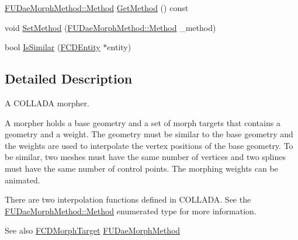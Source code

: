 \begin{DoxyCompactItemize}
\item 
\hyperlink{namespaceFUDaeMorphMethod_a097fa073638c4df9edf9479f8561329e}{FUDaeMorphMethod::Method} \hyperlink{classFCDMorphController_a71ff7b5ac5470f189b0f04f8674d2c3c}{GetMethod} () const 
\item 
void \hyperlink{classFCDMorphController_af7519da3b3d47febca0b7a36f34aa3ec}{SetMethod} (\hyperlink{namespaceFUDaeMorphMethod_a097fa073638c4df9edf9479f8561329e}{FUDaeMorphMethod::Method} \_\-method)
\item 
bool \hyperlink{classFCDMorphController_a43685ec9f55c43b66e75f62c8b820980}{IsSimilar} (\hyperlink{classFCDEntity}{FCDEntity} $\ast$entity)
\end{DoxyCompactItemize}


\subsection{Detailed Description}
A COLLADA morpher.

A morpher holds a base geometry and a set of morph targets that contains a geometry and a weight. The geometry must be similar to the base geometry and the weights are used to interpolate the vertex positions of the base geometry. To be similar, two meshes must have the same number of vertices and two splines must have the same number of control points. The morphing weights can be animated.

There are two interpolation functions defined in COLLADA. See the \hyperlink{namespaceFUDaeMorphMethod_a097fa073638c4df9edf9479f8561329e}{FUDaeMorphMethod::Method} enumerated type for more information.

\begin{DoxySeeAlso}{See also}
\hyperlink{classFCDMorphTarget}{FCDMorphTarget} \hyperlink{namespaceFUDaeMorphMethod}{FUDaeMorphMethod} 
\end{DoxySeeAlso}


